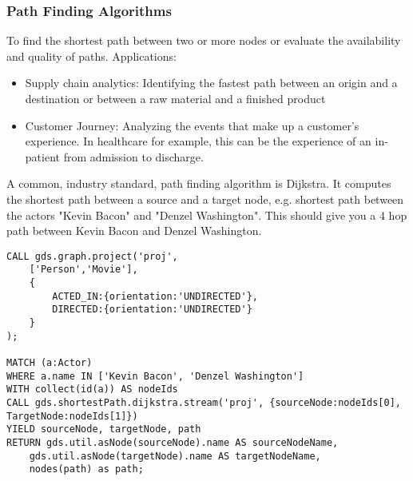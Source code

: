 \begin{frame}[fragile]\frametitle{Path Finding Algorithms}

 To find the shortest path between two or more nodes or evaluate the availability and quality of paths. Applications:
 
\begin{itemize}
\item  Supply chain analytics: Identifying the fastest path between an origin and a destination or between a raw material and a finished product
\item  Customer Journey: Analyzing the events that make up a customer’s experience. In healthcare for example, this can be the experience of an in-patient from admission to discharge.
\end{itemize}

A common, industry standard, path finding algorithm is Dijkstra. It computes the shortest path between a source and a target node, e.g. shortest path between the actors "Kevin Bacon" and "Denzel Washington". This should give you a 4 hop path between Kevin Bacon and Denzel Washington.

\begin{lstlisting}
CALL gds.graph.project('proj',
    ['Person','Movie'],
    {
        ACTED_IN:{orientation:'UNDIRECTED'},
        DIRECTED:{orientation:'UNDIRECTED'}
    }
);

MATCH (a:Actor)
WHERE a.name IN ['Kevin Bacon', 'Denzel Washington']
WITH collect(id(a)) AS nodeIds
CALL gds.shortestPath.dijkstra.stream('proj', {sourceNode:nodeIds[0], TargetNode:nodeIds[1]})
YIELD sourceNode, targetNode, path
RETURN gds.util.asNode(sourceNode).name AS sourceNodeName,
    gds.util.asNode(targetNode).name AS targetNodeName,
    nodes(path) as path;
\end{lstlisting}


\end{frame}

